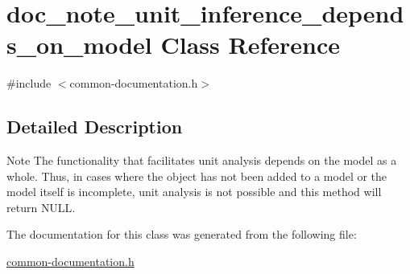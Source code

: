 \hypertarget{classdoc__note__unit__inference__depends__on__model}{}\section{doc\+\_\+note\+\_\+unit\+\_\+inference\+\_\+depends\+\_\+on\+\_\+model Class Reference}
\label{classdoc__note__unit__inference__depends__on__model}


{\ttfamily \#include $<$common-\/documentation.\+h$>$}



\subsection{Detailed Description}
\begin{DoxyNote}{Note}
The functionality that facilitates unit analysis depends on the model as a whole. Thus, in cases where the object has not been added to a model or the model itself is incomplete, unit analysis is not possible and this method will return {\ttfamily N\+U\+LL}. 
\end{DoxyNote}


The documentation for this class was generated from the following file\+:\begin{DoxyCompactItemize}
\item 
\hyperlink{common-documentation_8h}{common-\/documentation.\+h}\end{DoxyCompactItemize}

